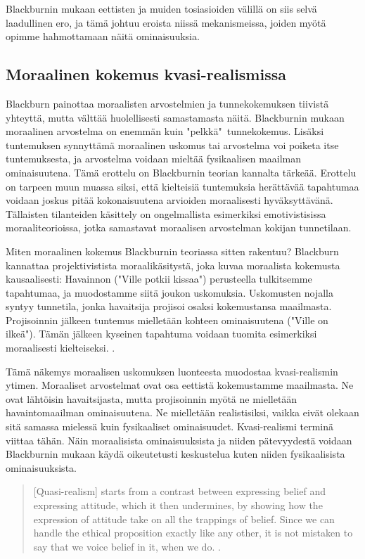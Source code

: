 \documentclass[a4paper,12pt,times,titlepage,finnish]{article}
\begin{document}
Blackburnin mukaan eettisten ja muiden tosiasioiden välillä on siis selvä laadullinen ero, ja tämä johtuu eroista niissä mekanismeissa, joiden myötä opimme hahmottamaan näitä ominaisuuksia. 

\subsection{Moraalinen kokemus kvasi-\-realismissa}

Blackburn painottaa moraalisten arvostelmien ja tunnekokemuksen tiivistä yh\-te\-yt\-tä, mutta välttää huolellisesti samastamasta näitä. Blackburnin mukaan moraalinen arvostelma on enemmän kuin "pelkkä"\ tunnekokemus. Lisäksi tuntemuksen synnyttämä moraalinen uskomus tai arvostelma voi poiketa itse tuntemuksesta, ja arvostelma voidaan mieltää fysikaalisen maailman ominaisuutena. Tä\-mä erottelu on Blackburnin teorian kannalta tärkeää. Erottelu on tarpeen muun muassa siksi, että kielteisiä tuntemuksia herättävää tapahtumaa voidaan joskus pitää kokonaisuutena arvioiden moraalisesti hyväksyttävänä. Tällaisten tilanteiden käsittely on ongelmallista esimerkiksi emotivistisissa moraaliteorioissa, jotka samastavat moraalisen arvostelman kokijan tunnetilaan.

Miten moraalinen kokemus Blackburnin teoriassa sitten rakentuu? Blackburn kannattaa projektivistista moraalikäsitystä, joka kuvaa moraalista kokemusta kausaalisesti: Havainnon ("Ville potkii kissaa") perusteella tulkitsemme tapahtumaa, ja muodostamme siitä joukon uskomuksia. Uskomusten nojalla syntyy tunnetila, jonka havaitsija projisoi osaksi kokemustansa maailmasta. Projisoinnin jälkeen tuntemus mielletään kohteen ominaisuutena ("Ville on ilkeä"). Tä\-män jälkeen kyseinen tapahtuma voidaan tuomita esimerkiksi moraalisesti kielteiseksi. \citep[ks.][]{projectivismSE}. 

Tä\-mä näkemys moraalisen uskomuksen luonteesta muodostaa kvasi-\-realismin ytimen. Moraaliset arvostelmat ovat osa eettistä kokemustamme maailmasta. Ne ovat lähtöisin havaitsijasta, mutta projisoinnin myötä ne mielletään havaintomaailman ominaisuutena. Ne mielletään realistisiksi, vaikka eivät olekaan sitä samassa mielessä kuin fysikaaliset ominaisuudet. Kvasi-realismi terminä viittaa tähän. Näin moraalisista ominaisuuksista ja niiden pätevyydestä voidaan Blackburnin mukaan käydä oikeutetusti keskustelua kuten niiden fysikaalisista ominaisuuksista.

\begin{quote}
	[Quasi-realism] starts from a contrast between expressing belief and expressing attitude, which it then undermines, by showing how the expression of attitude take on all the trappings of belief. Since we can handle the ethical proposition exactly like any other, it is not mistaken to say that we voice belief in it, when we do. \citep[79]{Blackburn98}.
\end{quote}
\end{document}
